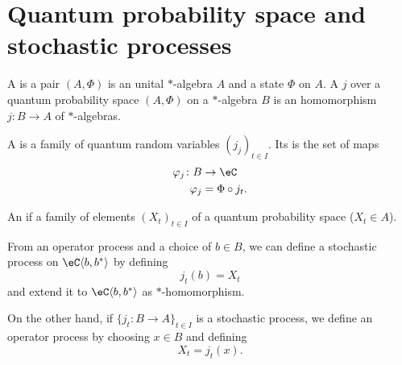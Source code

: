 \section{Quantum probability space and stochastic processes}

\begin{definition}
    A  is a pair $(A,\Phi)$ is an unital $*$-algebra $A$ and a state $\Phi$ on $A$. A  $j$ over a quantum probability space $(A,\Phi)$ on a $*$-algebra $B$ is an homomorphism $j\colon B\to A$ of $*$-algebras.
\end{definition}

\begin{definition}
A  is a family of quantum random variables $(j_j)_{t\in I}$. Its  is the set of maps
\begin{equation}
    \begin{aligned}
        \varphi_j\colon B&\to \eC \\
        \varphi_j&=\Phi\circ j_t.
    \end{aligned}
\end{equation}
\end{definition}

\begin{definition}
An  if a family of elements $(X_t)_{t\in I}$ of a quantum probability space ($X_t\in A$).
\end{definition}

From an operator process and a choice of $b\in B$, we can define a stochastic process on $\eC\langle b,b^*\rangle$ by defining
\begin{equation}
    j_t(b)=X_t
\end{equation}
and extend it to $\eC\langle b,b^*\rangle$ as $*$-homomorphism.

On the other hand, if $\{ j_t\colon B\to A \}_{t\in I}$ is a stochastic process, we define an operator process by choosing $x\in B$ and defining
\begin{equation}
    X_t=j_t(x).
\end{equation}

